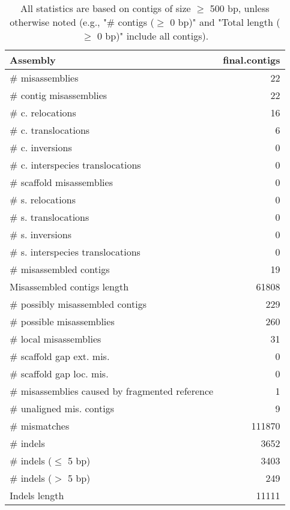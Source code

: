 \documentclass[12pt,a4paper]{article}
\begin{document}
\begin{table}[ht]
\begin{center}
\caption{All statistics are based on contigs of size $\geq$ 500 bp, unless otherwise noted (e.g., "\# contigs ($\geq$ 0 bp)" and "Total length ($\geq$ 0 bp)" include all contigs).}
\begin{tabular}{|l*{1}{|r}|}
\hline
Assembly & final.contigs \\ \hline
\# misassemblies & 22 \\ \hline
\hspace{2mm}\# contig misassemblies & 22 \\ \hline
\hspace{5mm}\# c. relocations & 16 \\ \hline
\hspace{5mm}\# c. translocations & 6 \\ \hline
\hspace{5mm}\# c. inversions & 0 \\ \hline
\hspace{5mm}\# c. interspecies translocations & 0 \\ \hline
\hspace{2mm}\# scaffold misassemblies & 0 \\ \hline
\hspace{5mm}\# s. relocations & 0 \\ \hline
\hspace{5mm}\# s. translocations & 0 \\ \hline
\hspace{5mm}\# s. inversions & 0 \\ \hline
\hspace{5mm}\# s. interspecies translocations & 0 \\ \hline
\# misassembled contigs & 19 \\ \hline
Misassembled contigs length & 61808 \\ \hline
\# possibly misassembled contigs & 229 \\ \hline
\hspace{5mm}\# possible misassemblies & 260 \\ \hline
\# local misassemblies & 31 \\ \hline
\# scaffold gap ext. mis. & 0 \\ \hline
\# scaffold gap loc. mis. & 0 \\ \hline
\# misassemblies caused by fragmented reference & 1 \\ \hline
\# unaligned mis. contigs & 9 \\ \hline
\# mismatches & 111870 \\ \hline
\# indels & 3652 \\ \hline
\hspace{5mm}\# indels ($\leq$ 5 bp) & 3403 \\ \hline
\hspace{5mm}\# indels ($>$ 5 bp) & 249 \\ \hline
Indels length & 11111 \\ \hline
\end{tabular}
\end{center}
\end{table}
\end{document}
